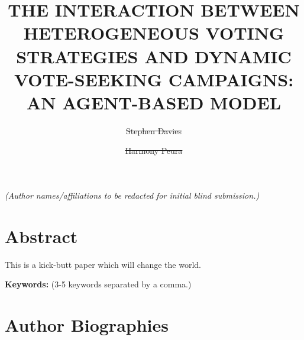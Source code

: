 \documentclass{scspaperproc}
\begin{document}

\def\SCSconferencename{Annual Simulation Conference}

\def\SCSconferenceacro{ANNSIM'24}

\def\SCSpublicationyear{2024}

\def\SCSconferenceeditors{P.J. Giabbanelli, I. David, C. Ruiz-Martin, B. Oakes and R. C\'{a}rdenas}

\def\SCSconferencedates{May 20-23}

\def\SCSconferencevenue{American University, DC, USA}

\title{THE INTERACTION BETWEEN HETEROGENEOUS VOTING STRATEGIES AND DYNAMIC
VOTE-SEEKING CAMPAIGNS: AN AGENT-BASED MODEL}

\textit{(Author names/affiliations to be redacted for initial blind submission.)}
\author[\authorrefmark{1}]{\sout{Stephen Davies}}
\author[\authorrefmark{1}]{\sout{Harmony Peura}}



\maketitle

\section*{Abstract}

This is a kick-butt paper which will change the world.


\textbf{Keywords:} (3-5 keywords separated by a comma.)


















\section*{Author Biographies}
\end{document}
